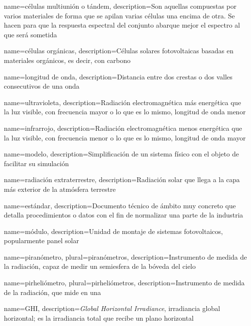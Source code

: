 {
    name={células multiunión o tándem},
    description={Son aquellas compuestas por varios materiales de forma que se apilan varias células una encima de otra. Se hacen para que la \gls{respuesta espectral} del conjunto abarque mejor el espectro al que será sometida}
}

{
    name={células orgánicas},
    description={Células solares fotovoltaicas basadas en materiales orgánicos, es decir, con carbono}
}

{
    name={longitud de onda},
    description={Distancia entre dos crestas o dos valles consecutivos de una onda}
}

{
    name={ultravioleta},
    description={Radiación electromagnética más energética que la luz visible, con frecuencia mayor o lo que es lo mismo, \gls{longitud de onda} menor}
}

{
    name={infrarrojo},
    description={Radiación electromagnética menos energética que la luz visible, con frecuencia menor o lo que es lo mismo, \gls{longitud de onda} mayor}
}

{
    name={modelo},
    description={Simplificación de un sistema físico con el objeto de facilitar su simulación}
}

{
    name={radiación extraterrestre},
    description={Radiación solar que llega a la capa más exterior de la atmósfera terrestre}
}

{
    name={estándar},
    description={Documento técnico de ámbito muy concreto que detalla procedimientos o datos con el fin de normalizar una parte de la industria}
}

{
    name={módulo},
    description={Unidad de montaje de sistemas fotovoltaicos, popularmente panel solar}
}

{
    name={piranómetro},
    plural={piranómetros},
    description={Instrumento de medida de la radiación, capaz de medir un semiesfera de la bóveda del cielo}
}

{
    name={pirheliómetro},
    plural={pirheliómetros},
    description={Instrumento de medida de la radiación, que mide en una }
}

{
    name={GHI},
    description={\textit{Global Horizontal Irradiance}, irradiancia global horizontal; es la irradiancia total que recibe un plano horizontal}
}

